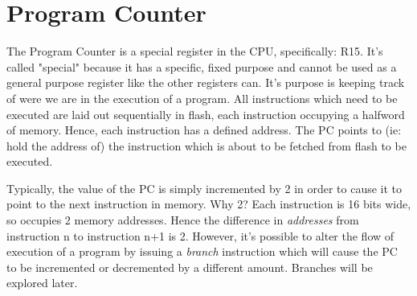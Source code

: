 \section{Program Counter}
The Program Counter is a special register in the CPU, specifically: R15. It's called "special" because it has a specific, fixed purpose and cannot be used as a general purpose register like the other registers can. It's purpose is keeping track of were we are in the execution of a program. All instructions which need to be executed are laid out sequentially in flash, each instruction occupying a halfword of memory. Hence, each instruction has a defined address. The PC points to (ie: hold the address of) the instruction which is about to be fetched from flash to be executed. 

Typically, the value of the PC is simply incremented by 2 in order to cause it to point to the next instruction in memory. Why 2? Each instruction is 16 bits wide, so occupies 2 memory addresses. Hence the difference in \emph{addresses} from instruction n to instruction n+1 is 2. However, it's possible to alter the flow of execution of a program by issuing a \emph{branch} instruction which will cause the PC to be incremented or decremented by a different amount. Branches will be explored later.

